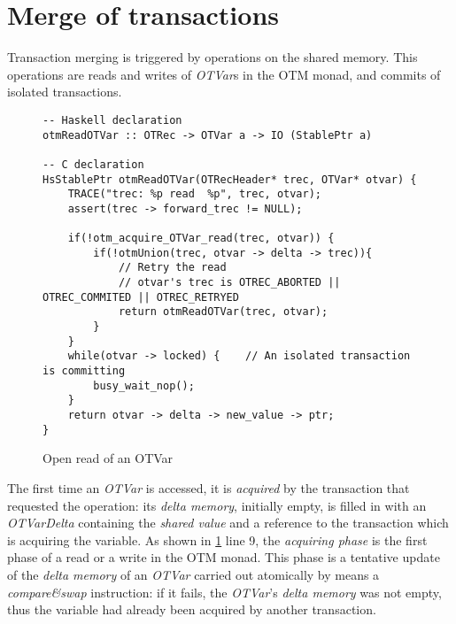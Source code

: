 \section{Merge of transactions}

Transaction merging is triggered by operations on the shared memory.
This operations are reads and writes of \emph{OTVar}s in the OTM monad, and commits of isolated transactions.

\begin{figure}
\begin{lstlisting}
-- Haskell declaration
otmReadOTVar :: OTRec -> OTVar a -> IO (StablePtr a)

-- C declaration
HsStablePtr otmReadOTVar(OTRecHeader* trec, OTVar* otvar) {
    TRACE("trec: %p read  %p", trec, otvar);
    assert(trec -> forward_trec != NULL);

    if(!otm_acquire_OTVar_read(trec, otvar)) {
        if(!otmUnion(trec, otvar -> delta -> trec)){
            // Retry the read
            // otvar's trec is OTREC_ABORTED || OTREC_COMMITED || OTREC_RETRYED
            return otmReadOTVar(trec, otvar);
        }
    }
    while(otvar -> locked) {    // An isolated transaction is committing
        busy_wait_nop();
    }
    return otvar -> delta -> new_value -> ptr;
}
\end{lstlisting}
\caption{Open read of an OTVar}
\label{fig:otmread}
\end{figure}

The first time an \emph{OTVar} is accessed, it is \emph{acquired} by the transaction that requested the operation: its \emph{delta memory}, initially empty, is filled in with an \emph{OTVarDelta} containing the \emph{shared value} and a reference to the transaction which is acquiring the variable.
As shown in \cref{fig:otmread} line 9, the \emph{acquiring phase} is the first phase of a read or a write in the OTM monad.
This phase is a tentative update of the \emph{delta memory} of an \emph{OTVar} carried out atomically by means a \emph{compare\&swap} instruction: if it fails, the \emph{OTVar}'s \emph{delta memory} was not empty, thus the variable had already been acquired by another transaction.


